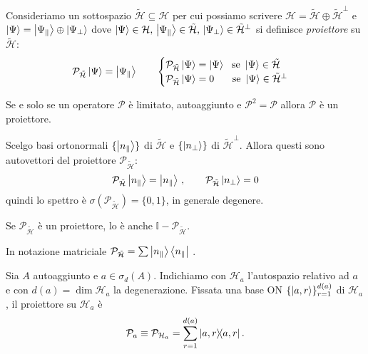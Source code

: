 \begin{definition}
    Consideriamo un sottospazio \(\tilde{\mathcal{H}}\subseteq \mathcal{H}\) per cui possiamo scrivere 
    \(\mathcal{H} = \tilde{\mathcal{H}} \oplus \tilde{\mathcal{H}}^\perp\) e \(\ket{\Psi} = \ket{\Psi_\parallel} \oplus \ket{\Psi_\perp}\) 
    dove \(\ket{\Psi} \in \mathcal{H},\,\ket{\Psi_\parallel} \in\tilde{\mathcal{H}},\, \ket{\Psi_\perp}\in\tilde{\mathcal{H}}^\perp\) si definisce
    \textit{proiettore} su \(\tilde{\mathcal{H}}\):
    \begin{equation}
        \mathcal{P}_{\tilde{\mathcal{H}}}\ket{\Psi}= \ket{\Psi_\parallel} \qquad 
    \begin{cases}
        \mathcal{P}_{\tilde{\mathcal{H}}} \ket{\Psi}= \ket{\Psi}   \ \text{ se } \ket{\Psi} \in  \tilde{\mathcal{H}}\\
        \mathcal{P}_{\tilde{\mathcal{H}}} \ket{\Psi}= 0   \quad \, \ \text{ se } \ket{\Psi} \in  \tilde{\mathcal{H}}^\perp
    \end{cases}
    \end{equation}
\end{definition}

\begin{theorem}
    Se e solo se un operatore \(\mathcal{P}\) è limitato, autoaggiunto e \(\mathcal{P}^2=\mathcal{P}\) allora \(\mathcal{P}\) è un proiettore.
\end{theorem}

Scelgo basi ortonormali \(\{\ket{n_\parallel}\}\) di \(\tilde{\mathcal{H}}\) e \(\{\ket{n_\perp}\}\) di \(\tilde{\mathcal{H}}^{\perp}\).
Allora questi sono autovettori del proiettore \(\mathcal{P}_{\tilde{\mathcal{H}}}\):
\[
    \mathcal{P}_{\tilde{\mathcal{H}}}\ket{n_\parallel}= \ket{n_\parallel}\,,\qquad
    \mathcal{P}_{\tilde{\mathcal{H}}}\ket{n_\perp}= 0
\]
quindi lo spettro è \(\sigma(\mathcal{P}_{\tilde{\mathcal{H}}})= \{0,1\}\), in generale degenere.

\begin{remark}
    Se \(\mathcal{P}_{\tilde{\mathcal{H}}} \) è un proiettore, lo è anche \(\mathbb{I}- \mathcal{P}_{\tilde{\mathcal{H}}}\).
\end{remark}
\begin{remark}
    In notazione matriciale \(\mathcal{P}_{\tilde{\mathcal{H}}}= \sum \ket{n_\parallel}\bra{n_\parallel}\) .
\end{remark}


Sia \(A\) autoaggiunto e \(a\in \sigma_d(A)\). Indichiamo con \(\mathcal{H}_a\) l'autospazio relativo ad \(a\) e con \(d(a)= \dim \mathcal{H}_a\) la degenerazione. 
Fissata una base ON \(\{\ket{a,r}\}_{r=1}^{d(a)}\) di \(\mathcal{H}_a\), il proiettore su \(\mathcal{H}_a\) è
\[
    \mathcal{P}_a \equiv \mathcal{P}_{\mathcal{H}_a}= \sum_{r=1}^{d(a)} \dyad{a,r}{a,r}.
\]

